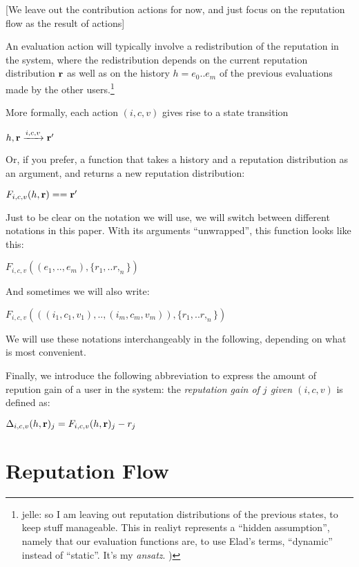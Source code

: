 \documentclass{article}
\begin{document}
[We leave out the contribution actions for now, and just focus on the reputation flow as the result of actions]

An evaluation action will typically involve a redistribution of the reputation in the system, where the redistribution depends on the current reputation distribution ${\bf r}$ as well as on the history $h = e_0 .. e_m$  of the previous evaluations made by the other users.\footnote{jelle: so I am leaving out reputation distributions of the previous states, to keep stuff manageable. This in realiyt represents a ``hidden assumption'', namely that our evaluation functions are, to use Elad's terms, ``dynamic'' instead of ``static''. It's my {\em ansatz}. )}

More formally, each action $(i, c, v)$ gives rise to a state transition

\begin{center}
{ $h, {\bf r} \xrightarrow{i,c,v} {\bf r'}$ }
\end{center}
Or, if you prefer,  a function that takes a history and a reputation distribution as an argument, and returns a new reputation distribution:
\begin{center}
$F_{i,c,v}(h, {\bf r}) == {\bf r'}$
\end{center}

Just to be clear on the notation we will use, we will switch between different notations in this paper. With its arguments ``unwrapped'', this function looks like this:
\begin{center}
$F_{i,c,v}((e_1, .. , e_m), \{r_1, .. r,_n\})$
\end{center}
And sometimes we will also write:
\begin{center}
$F_{i,c,v}(((i_1,c_1,v_1), .. , (i_m, c_m, v_m)), \{r_1, .. r,_n\})$
\end{center}
We will use these notations interchangeably in the following, depending on what is most convenient.

Finally, we introduce the following abbreviation to express the amount of repution gain of a user in the system: the {\em reputation gain of $j$ given $(i, c, v)$} is defined as:
\begin{center}
 $ \Delta_{i, c, v}(h, {\bf r})_j =  F_{i, c, v}(h, {\bf r})_j - r_j$
\end{center}

\section{Reputation Flow}
\end{document}
